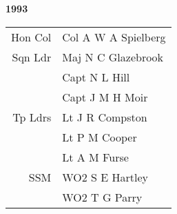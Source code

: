 \begin{center}
  \Huge
  \textbf{1993}
\end{center}

\begin{center}
  \small
  \begin{tabular}{rl}
    Hon Col & Col A W A Spielberg \\
    Sqn Ldr & Maj N C Glazebrook \\
      & Capt N L Hill \\
      & Capt J M H Moir \\
    Tp Ldrs & Lt J R Compston \\
      & Lt P M Cooper \\
      & Lt A M Furse \\
    SSM & WO2 S E Hartley \\
      & WO2 T G Parry \\
  \end{tabular}
\end{center}

